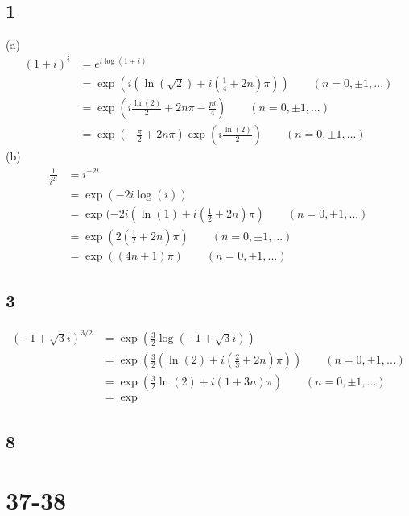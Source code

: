 \documentclass{article}
\begin{document}
\subsection*{1}
(a) \begin{align*}
    (1 + i)^i & = e^{i\log(1+i)}                                                               \\
              & = \exp(i(\ln(\sqrt{2})+ i(\frac{1}{4} + 2n)\pi)) \qquad (n=0,\pm 1,...)        \\
              & = \exp(i\frac{\ln(2)}{2} + 2n\pi - \frac{pi}{4}) \qquad (n = 0, \pm 1,...)     \\
              & = \exp(-\frac{\pi}{2} + 2n\pi)\exp(i\frac{\ln(2)}{2}) \qquad (n= 0, \pm 1,...)
\end{align*}
(b) \begin{align*}
    \frac{1}{i^{2i}} & = i^{-2i}                                                            \\
                     & = \exp(-2i\log(i))                                                   \\
                     & = \exp(-2i(\ln(1) + i(\frac{1}{2} + 2n)\pi) \qquad (n= 0, \pm 1,...) \\
                     & = \exp(2(\frac{1}{2} + 2n)\pi) \qquad (n= 0, \pm 1,...)              \\
                     & = \exp((4n + 1)\pi) \qquad (n=0,\pm 1,...)
\end{align*}
\subsection*{3}
\begin{align*}
    (-1 + \sqrt{3}i)^{3/2} & = \exp(\frac{3}{2}\log(-1 + \sqrt{3}i))                                   \\
                           & = \exp(\frac{3}{2}(\ln(2) + i(\frac{2}{3} +2n)\pi)) \qquad (n=0,\pm1,...) \\
                           & = \exp(\frac{3}{2}\ln(2) + i(1 + 3n)\pi) \qquad (n=0,\pm 1,...)           \\
                           & = \exp
\end{align*}
\subsection*{8}
\section*{37-38}
\end{document}
